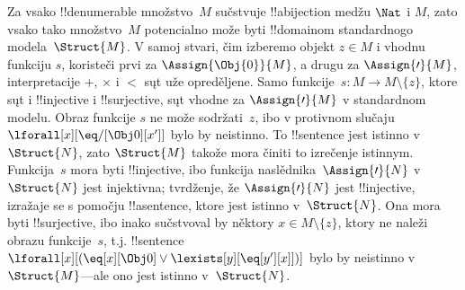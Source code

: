 \documentclass[../../../include/open-logic-section]{subfiles}
\begin{document}
\begin{explain}
Za vsako !!{denumerable} množstvo~$M$ sučstvuje !!a{bijection}
medžu $\Nat$ i $M$, zato vsako tako množstvo~$M$ potencialno može byti
!!{domain}om standardnogo modela~$\Struct{M}$. V samoj stvari, čim
izberemo objekt $z \in M$ i vhodnu funkciju $s$, koristeči prvi za
$\Assign{\Obj{0}}{M}$, a drugu za $\Assign{\prime}{M}$, interpretacije $+$,
$\times$ i $<$ sųt uže opreděljene. Samo funkcije~$s\colon M \to M
\setminus \{z\}$,
ktore sųt i !!{injective} i !!{surjective}, sųt vhodne za
$\Assign{\prime}{M}$ v standardnom modelu. Obraz funkcije $s$ ne može
sodržati~$z$, ibo v protivnom slučaju
$\lforall[x][\eq/[\Obj 0][x']]$ bylo by neistinno. To !!{sentence} jest
istinno v~$\Struct{N}$, zato $\Struct{M}$ takože mora činiti to
izrečenje istinnym. Funkcija~$s$ mora byti !!{injective}, ibo funkcija
naslědnika~$\Assign{\prime}{N}$ v~$\Struct{N}$ jest injektivna;
tvrdženje, že $\Assign{\prime}{N}$ jest !!{injective}, izražaje se s
pomočju !!a{sentence}, ktore jest istinno v~$\Struct{N}$. Ona mora
byti !!{surjective}, ibo inako sučstvoval by
něktory $x \in M \setminus \{z\}$, ktory ne naleži obrazu
funkcije~$s$, t.j. !!{sentence} $\lforall[x][(\eq[x][\Obj 0] \lor
\lexists[y][\eq[y'][x]])]$ bylo by neistinno v~$\Struct{M}$---ale ono
jest istinno v~$\Struct{N}$.
\end{explain}
\end{document}
